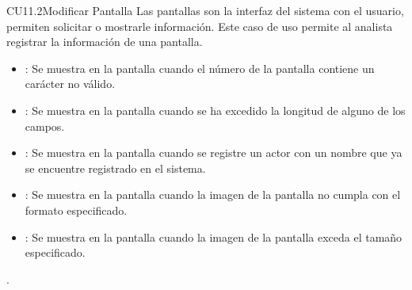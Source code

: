 \begin{UseCase}{CU11.2}{Modificar Pantalla}{
		Las pantallas son la interfaz del sistema con el usuario, permiten solicitar o mostrarle información. Este caso de uso permite al analista registrar la información de una pantalla.
	}
{\begin{itemize}
		\item {}: Se muestra en la pantalla  cuando el número de la pantalla contiene un carácter no válido.
		\item {}: Se muestra en la pantalla  cuando se ha excedido la longitud de alguno de los campos.
		\item {}: Se muestra en la pantalla  cuando se registre un actor con un nombre que ya se encuentre registrado en el sistema.
		\item {}: Se muestra en la pantalla  cuando la imagen de la pantalla no cumpla con el formato especificado.
		\item {}: Se muestra en la pantalla  cuando la imagen de la pantalla exceda el tamaño especificado.
		\end{itemize}.
		}
	\end{UseCase}
